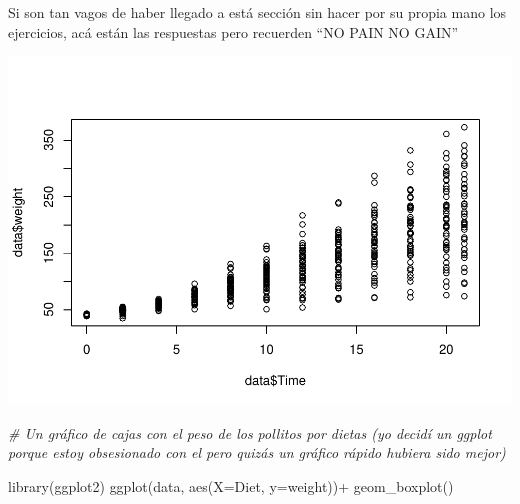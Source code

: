 \documentclass[
]{book}
\newenvironment{Shaded}{\begin{snugshade}}{\end{snugshade}}
\newcommand{\AttributeTok}[1]{\textcolor[rgb]{0.77,0.63,0.00}{#1}}
\newcommand{\CommentTok}[1]{\textcolor[rgb]{0.56,0.35,0.01}{\textit{#1}}}
\newcommand{\FunctionTok}[1]{\textcolor[rgb]{0.00,0.00,0.00}{#1}}
\newcommand{\NormalTok}[1]{#1}
\newcommand{\OtherTok}[1]{\textcolor[rgb]{0.56,0.35,0.01}{#1}}
\newcommand{\SpecialCharTok}[1]{\textcolor[rgb]{0.00,0.00,0.00}{#1}}
\begin{document}
Si son tan vagos de haber llegado a está sección sin hacer por su propia mano los ejercicios, acá están las respuestas pero recuerden ``NO PAIN NO GAIN''

\begin{Shaded}
\end{Shaded}

\includegraphics{Esatadistica_en_R_files/figure-latex/unnamed-chunk-154-1.pdf}

\begin{Shaded}
\begin{Highlighting}[]
\CommentTok{\# Un gráfico de cajas con el peso de los pollitos por dietas (yo decidí un ggplot porque estoy obsesionado con el pero quizás un gráfico rápido hubiera sido mejor)}

\FunctionTok{library}\NormalTok{(ggplot2)}
\FunctionTok{ggplot}\NormalTok{(data, }\FunctionTok{aes}\NormalTok{(}\AttributeTok{X=}\NormalTok{Diet, }\AttributeTok{y=}\NormalTok{weight))}\SpecialCharTok{+}
  \FunctionTok{geom\_boxplot}\NormalTok{()}
\end{Highlighting}
\end{Shaded}
\end{document}
